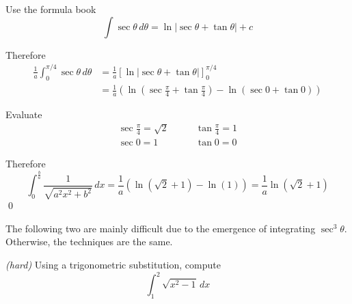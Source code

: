 \begin{solution}
    Use the formula book
    \[
        \int \sec\theta\,d\theta=\ln\left|\sec\theta+\tan\theta\right|+c
    \]

    Therefore
    \begin{align*}
        \frac{1}{a}\int_{0}^{\pi/4}\sec\theta\,d\theta
        &= \frac{1}{a}\left[\ln\left|\sec\theta+\tan\theta\right|\right]_{0}^{\pi/4}\\
        &= \frac{1}{a}\left(\ln\left(\sec\frac{\pi}{4}+\tan\frac{\pi}{4}\right)-\ln\left(\sec 0+\tan 0\right)\right)
    \end{align*}

    Evaluate
    \begin{align*}
        \sec\frac{\pi}{4}=\sqrt{2} &\qquad \tan\frac{\pi}{4}=1\\
        \sec 0=1 &\qquad \tan 0=0
    \end{align*}

    Therefore
    \[
        \int_{0}^{\frac{b}{a}}\frac{1}{\sqrt{a^2x^2+b^2}}\,dx
        = \frac{1}{a}\left(\ln(\sqrt{2}+1)-\ln(1)\right)
        = \frac{1}{a}\ln(\sqrt{2}+1)
    \]
    \qed
\end{solution}


The following two are mainly difficult due to the emergence of integrating $\sec^3 \theta$. Otherwise, the techniques are the same.

\begin{example} \emph{(hard)} \label{ex:trig-subs-containing-sec3}
    Using a trigonometric substitution, compute
    \[
        \int_{1}^{2}\sqrt{x^2-1}\,dx
    \]
\end{example}

